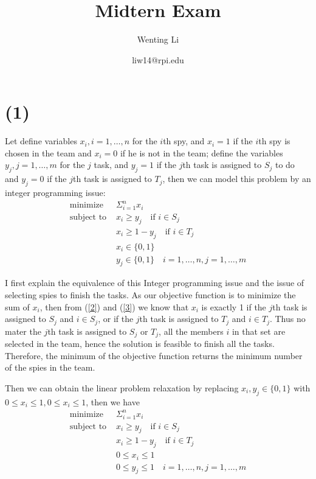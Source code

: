 \documentclass[a4paper,12pt]{article}
\begin{document}
	\title{Midtern Exam}
	\author{
			Wenting Li
		\and
			liw14@rpi.edu
			}
	\maketitle
\section*{(1)}
Let define variables $x_i, i= 1,\dots, n$ for the $i$th spy, and $x_i=1$ if the $i$th spy is chosen in the team and $x_i=0$ if he is not in the team; define the variables $y_j, j= 1,\dots, m$ for the $j$ task, and $y_j=1$ if the $j$th task is assigned to $S_j$ to do and $y_j=0$ if the $j$th task is assigned to $T_j$,  then we can model this problem by an integer programming issue:
\begin{align}
\text{minimize } & \Sigma_{ i= 1}^n   x_{i}\\
\text{subject to } &   x_i \geq y_j \quad \text{if } i \in S_j  \\ \label{2}
&  x_i \geq 1-y_j \quad \text{if } i \in T_j  \\ \label{3}
& x_i \in \{0,1\}  \\
& y_j \in \{0,1\} \quad i= 1,\dots, n, j= 1,\dots, m
\end{align}

I first explain the equivalence of this Integer programming issue and the issue of selecting spies to finish the tasks.  As our objective function is to minimize the sum of $x_i$, then from (\ref{2}) and (\ref{3}) we know that $x_i$ is exactly 1 if the $j$th task is assigned to $S_j$ and $i \in S_j$,  or if the $j$th task is assigned to $T_j$ and $i \in T_j$. Thus no mater the $j$th task is assigned to $S_j$ or $T_j$, all the members $i$ in that set are selected in the team, hence the solution is feasible to finish all the tasks. Therefore, the minimum of the objective function returns the minimum number of the spies in the team.

Then we can obtain the linear problem relaxation by replacing $ x_i, y_j \in \{0,1\}$ with $0 \leq x_i \leq 1, 0 \leq x_i \leq 1$, then we have
\begin{align}
\text{minimize } & \Sigma_{ i= 1 }^n   x_{i}\\ \label{S} 
\text{subject to } &   x_i \geq y_j \quad \text{if } i \in S_j \\ \label{T}
&  x_i \geq 1-y_j \quad \text{if } i \in T_j  \\ 
& 0 \leq x_i \leq 1  \\
&0 \leq y_j \leq 1 \quad i= 1,\dots, n, j= 1,\dots, m
\end{align}
\end{document}
